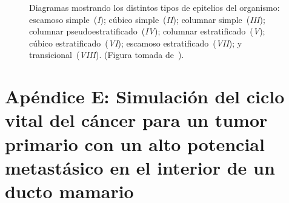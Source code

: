 \begin{figure}[!ht]
\begin{center}
\end{center}
\caption[Diagramas mostrando los distintos tipos de epitelios del organismo]{Diagramas mostrando los distintos tipos de epitelios del organismo: escamoso simple~(\emph{I});  c\'ubico simple~(\emph{II}); columnar simple~(\emph{III}); columnar pseudoestratificado~(\emph{IV}); columnar estratificado~(\emph{V}); c\'ubico estratificado~(\emph{VI}); escamoso estratificado~(\emph{VII}); y transicional~(\emph{VIII}). (Figura tomada de~\cite{robins}).}
\label{fig-epitheliums}
\end{figure}

\section{Ap\'endice E: Simulaci\'on del ciclo vital del c\'ancer para un tumor primario con un alto potencial metast\'asico en el interior de un ducto mamario}
\label{app-e}

